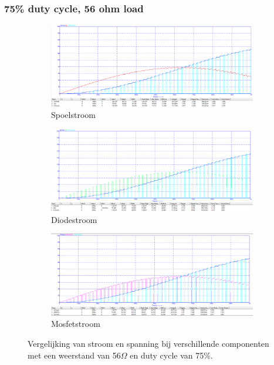 \subsubsection{75\% duty cycle, 56 ohm load}

\begin{figure}[h!]
    \centering
    \begin{subfigure}[b]{0.3\linewidth}
        \centering
        \includegraphics[width=\linewidth]{img/hfd1/hfd1-75pduty-56-INDUCTOR.png}
        \caption{Spoelstroom}
        \label{fig:inductor75}
    \end{subfigure}
    \hfill
    \begin{subfigure}[b]{0.3\linewidth}
        \centering
        \includegraphics[width=\linewidth]{img/hfd1/hfd1-75pduty-56-DIODE.png}
        \caption{Diodestroom}
        \label{fig:diode75}
    \end{subfigure}
    \hfill
    \begin{subfigure}[b]{0.3\linewidth}
        \centering
        \includegraphics[width=\linewidth]{img/hfd1/hfd1-75pduty-56-DMOSFET.png}
        \caption{Mosfetstroom}
        \label{fig:mosfet75}
    \end{subfigure}
    
    \caption{Vergelijking van stroom en spanning bij verschillende componenten met een weerstand van 56\(\Omega\) en duty cycle van 75\%.}
    \label{fig:componenten75}
\end{figure}

